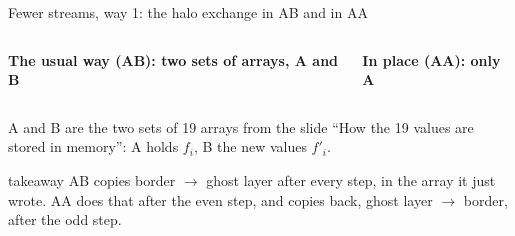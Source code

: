 \documentclass[aspectratio=169,10pt,t]{beamer}
\newcommand{\takeaway}[1]{\par\vfill
  \begin{beamercolorbox}[wd=\textwidth,sep=4pt,rounded=true]{takeaway}
    \small #1
  \end{beamercolorbox}}
\begin{document}
\begin{frame}{Fewer streams, way 1: the halo exchange in AB and in AA}
  \vspace{0mm}
  \begin{columns}[T,onlytextwidth]
    {\small\bfseries The usual way (AB): two sets of arrays, A and B\par}
    \vspace{1mm}
    \centering
    \par
    \vspace{1mm}
    \par
    {\small\bfseries In place (AA): only A\par}
    \vspace{1mm}
    \centering
    \par
    \vspace{1mm}
    \par
  \end{columns}
  \vspace{-1mm}
  \centering\halolegend\par
  {\scriptsize\color{psgray}A and B are the two sets of 19 arrays from the slide ``How the 19 values are stored in
  memory'': A holds $f_i$, B the new values $f'_i$.\par}
  \takeaway{AB copies border $\rightarrow$ ghost layer after every step, in the array it just wrote. AA does that after
    the even step, and copies back, ghost layer $\rightarrow$ border, after the odd step.}
\end{frame}
\end{document}
